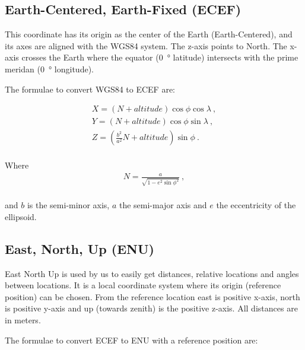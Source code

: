 \subsection{Earth-Centered, Earth-Fixed (ECEF)}

This coordinate has its origin as the center of the Earth
(Earth-Centered), and its axes are aligned with the WGS84 system. The
z-axis points to North. The x-axis crosses the Earth where the equator
(\SI{0}{\degree} latitude) intersects with the prime meridan
(\SI{0}{\degree} longitude).

The formulae to convert WGS84 to ECEF are:

\begin{equation}
    \begin{array}{l}
        X = (N + altitude) \cos{\phi} \cos{\lambda} \ , \\
        Y = (N + altitude) \cos{\phi} \sin{\lambda} \ , \\
        Z = (\frac{b^2}{a^2} N + altitude) \sin{\phi} \ . \\
    \end{array}
\end{equation}

Where
\begin{equation}
    \begin{array}{l}
        N = \frac{a}{\sqrt{1 - e^2 \sin{\phi}^2}} \ , \\
    \end{array}
\end{equation}

and $b$ is the semi-minor axis, $a$ the semi-major axis and $e$ the
eccentricity of the ellipsoid.


\subsection{East, North, Up (ENU)}

East North Up is used by us to easily get distances, relative locations
and angles between locations. It is a local coordinate system where its
origin (reference position) can be chosen. From the reference location
east is positive x-axis, north is positive y-axis and up (towards
zenith) is the positive z-axis. All distances are in meters.

The formulae to convert ECEF to ENU with a reference position are:

